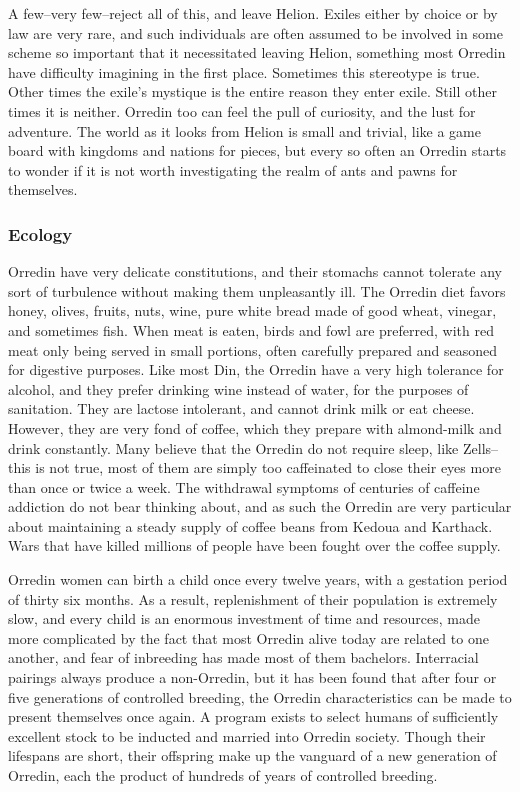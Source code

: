 \documentclass[oneside,11pt,english]{book}
\begin{document}
A few--very few--reject all of this, and leave Helion. Exiles either by choice or by law are very rare, and 
such individuals are often assumed to be involved in some scheme so important that it necessitated 
leaving Helion, something most Orredin have difficulty imagining in the first place. Sometimes this 
stereotype is true. Other times the exile’s mystique is the entire reason they enter exile. Still other times it 
is neither. Orredin too can feel the pull of curiosity, and the lust for adventure. The world as it looks from 
Helion is small and trivial, like a game board with kingdoms and nations for pieces, but every so often an 
Orredin starts to wonder if it is not worth investigating the realm of ants and pawns for themselves. 
\subsubsection*{Ecology} 
Orredin have very delicate constitutions, and their stomachs cannot tolerate any sort of turbulence without 
making them unpleasantly ill. The Orredin diet favors honey, olives, fruits, nuts, wine, pure white bread 
made of good wheat, vinegar, and sometimes fish. When meat is eaten, birds and fowl are preferred, with 
red meat only being served in small portions, often carefully prepared and seasoned for digestive 
purposes. Like most Din, the Orredin have a very high tolerance for alcohol, and they prefer drinking 
wine instead of water, for the purposes of sanitation. They are lactose intolerant, and cannot drink milk or 
eat cheese. However, they are very fond of coffee, which they prepare with almond-milk and drink 
constantly. Many believe that the Orredin do not require sleep, like Zells--this is not true, most of them 
are simply too caffeinated to close their eyes more than once or twice a week. The withdrawal symptoms 
of centuries of caffeine addiction do not bear thinking about, and as such the Orredin are very particular 
about maintaining a steady supply of coffee beans from Kedoua and Karthack. Wars that have killed 
millions of people have been fought over the coffee supply. 


Orredin women can birth a child once every twelve years, with a gestation period of thirty six months. As 
a result, replenishment of their population is extremely slow, and every child is an enormous investment 
of time and resources, made more complicated by the fact that most Orredin alive today are related to one 
another, and fear of inbreeding has made most of them bachelors. 
Interracial pairings always produce a non-Orredin, but it has been found that after four or five generations 
of controlled breeding, the Orredin characteristics can be made to present themselves once again. A 
program exists to select humans of sufficiently excellent stock to be inducted and married into Orredin 
society. Though their lifespans are short, their offspring make up the vanguard of a new generation of 
Orredin, each the product of hundreds of years of controlled breeding. 
\end{document}
